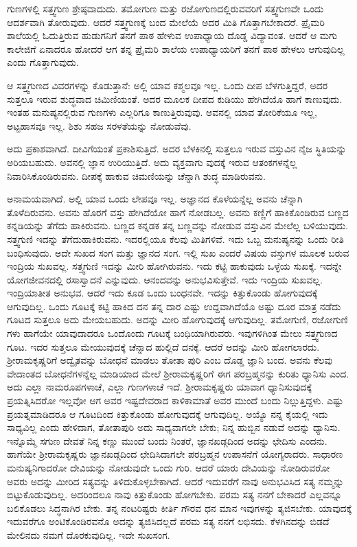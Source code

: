 ಗುಣಗಳಲ್ಲಿ ಸತ್ತ್ವಗುಣ ಶ್ರೇಷ್ಠವಾದುದು. ತಮೋಗುಣ ಮತ್ತು ರಜೋಗುಣದಲ್ಲಿರುವವರಿಗೆ ಸತ್ತ್ವಗುಣವೇ ಒಂದು ಆದರ್ಶವಾಗಿ ತೋರುವುದು. ಆದರೆ ಸತ್ತ್ವಗುಣಕ್ಕೆ ಬಂದ ಮೇಲೆಯೆ ಅದರ ಮಿತಿ ಗೊತ್ತಾಗಬೇಕಾದರೆ. ಪ್ರೈಮರಿ ಶಾಲೆಯಲ್ಲಿ ಓದುತ್ತಿರುವ ಹುಡುಗನಿಗೆ ತನಗೆ ಪಾಠ ಹೇಳುವ ಉಪಾಧ್ಯಾಯ ದೊಡ್ಡ ವಿದ್ಯಾವಂತ. ಆದರೆ ಆ ಮಗು ಕಾಲೇಜಿಗೆ ಏನಾದರೂ ಹೋದರೆ ಆಗ ತನ್ನ ಪ್ರೈಮರಿ ಶಾಲೆಯ ಉಪಾಧ್ಯಾಯರಿಗೆ ತನಗೆ ಪಾಠ ಹೇಳಲು ಆಗುವುದಿಲ್ಲ ಎಂದು ಗೊತ್ತಾಗುವುದು.

ಆ ಸತ್ತ್ವಗುಣದ ವಿವರಗಳನ್ನು ಕೊಡುತ್ತಾನೆ: ಅಲ್ಲಿ ಯಾವ ಕಶ್ಮಲವೂ ಇಲ್ಲ. ಒಂದು ದೀಪ ಬೆಳಗುತ್ತಿದ್ದರೆ, ಅದರ ಸುತ್ತಲೂ ಇರುವ ಶುದ್ಧವಾದ ಚಿಮಿಣಿಯಂತೆ. ಅದರ ಮೂಲಕ ದೀಪದ ಕುಡಿಯು ಹೇಗಿದೆಯೊ ಹಾಗೆ ಕಾಣುವುದು. ಇಂತಹ ಮನುಷ್ಯನಲ್ಲಿರುವ ಗುಣಗಳು ಎಲ್ಲರಿಗೂ ಕಾಣುತ್ತಿರುವುವು. ಅವನಲ್ಲಿ ಯಾವ ತೋರಿಕೆಯೂ ಇಲ್ಲ, ಅಟ್ಟಹಾಸವೂ ಇಲ್ಲ. ಶಿಶು ಸಹಜ ಸರಳತೆಯನ್ನು ನೋಡುವೆವು.

ಅದು ಪ್ರಕಾಶವಾಗಿದೆ. ದೀವಿಗೆಯಂತೆ ಪ್ರಕಾಶಿಸುತ್ತಿದೆ. ಅದರ ಬೆಳಕಿನಲ್ಲಿ ಸುತ್ತಲೂ ಇರುವ ವಸ್ತುವಿನ ನೈಜ ಸ್ಥಿತಿಯನ್ನು ಅರಿಯಬಹುದು. ಅವನಲ್ಲಿ ಜ್ಞಾನ ಉರಿಯುತ್ತಿದೆ. ಅದು ವ್ಯಕ್ತವಾಗು ವುದಕ್ಕೆ ಇರುವ ಆತಂಕಗಳನ್ನೆಲ್ಲ ನಿವಾರಿಸಿಕೊಂಡಿರುವನು. ದೀಪಕ್ಕೆ ಹಾಕುವ ಚಿಮಣಿಯನ್ನು ಚೆನ್ನಾಗಿ ಶುದ್ಧ ಮಾಡಿರುವನು.

ಅನಾಮಯವಾಗಿದೆ. ಅಲ್ಲಿ ಯಾವ ಒಂದು ಲೇಪವೂ ಇಲ್ಲ. ಅಜ್ಞಾನದ ಕೊಳೆಯನ್ನೆಲ್ಲ ಅವನು ಚೆನ್ನಾಗಿ ತೊಳೆದಿರುವನು. ಅವನು ಹೊರಗೆ ವಸ್ತು ಹೇಗಿದೆಯೋ ಹಾಗೆ ನೋಡಬಲ್ಲ. ಅವನು ಕಣ್ಣಿಗೆ ಹಾಕಿಕೊಂಡಿರುವ ಬಣ್ಣದ ಕನ್ನಡಿಯನ್ನು ತೆಗೆದು ಹಾಕಿರುವನು. ಬಣ್ಣದ ಕನ್ನಡಕ ತನ್ನ ಬಣ್ಣವನ್ನು ನೋಡುವ ವಸ್ತುವಿನ ಮೇಲೆಲ್ಲ ಬಳಿಯುವುದು. ಸತ್ತ್ವಗುಣಿ ಇದನ್ನು ತೆಗೆದುಹಾಕಿರುವನು. ಇದರಲ್ಲಿಯೂ ಕೆಲವು ಮಿತಿಗಳಿವೆ. ಇದು ಒಬ್ಬ ಮನುಷ್ಯನನ್ನು ಒಂದು ರೀತಿ ಬಂಧಿಸುವುದು. ಅದೇ ಸುಖದ ಸಂಗ ಮತ್ತು ಜ್ಞಾನದ ಸಂಗ. ಇಲ್ಲಿ ಸುಖ ಎಂದರೆ ವಿಷಯ ವಸ್ತುಗಳ ಮೂಲಕ ಬರುವ ಇಂದ್ರಿಯ ಸುಖವಲ್ಲ. ಸತ್ತ್ವಗುಣಿ ಇದನ್ನು ಮೀರಿ ಹೋಗಿರುವನು. ಇದು ಕಟ್ಟಿ ಹಾಕುವುದು ಒಳ್ಳೆಯ ಸುಖಕ್ಕೆ. ಇದನ್ನೇ ಯೋಗಜೀವನದಲ್ಲಿ ರಸಾಸ್ವಾದನೆ ಎನ್ನುವುದು. ಆನಂದವನ್ನು ಅನುಭವಿಸುತ್ತೇವೆ. ಇದು ಇಂದ್ರಿಯ ಸುಖವಲ್ಲ. ಇಂದ್ರಿಯಾತೀತ ಅನುಭವ. ಆದರೆ ಇದು ಕೂಡ ಒಂದು ಬಂಧನವೇ. ಇದನ್ನು ಕಿತ್ತುಕೊಂಡು ಹೋಗುವುದಕ್ಕೆ ಆಗುವುದಿಲ್ಲ. ಒಂದು ಗೂಟಕ್ಕೆ ಕಟ್ಟಿ ಹಾಕಿದ ದನ ತನ್ನ ದಾರ ಎಷ್ಟು ಉದ್ದವಾಗಿದೆಯೊ ಅಷ್ಟು ದೂರ ಮಾತ್ರ ನಡೆದು ಗೂಟದ ಸುತ್ತಲೂ ಅದು ಮೇಯಬಹುದು. ಅದನ್ನು ಮೀರಿ ಹೋಗುವುದಕ್ಕೆ ಆಗುವುದಿಲ್ಲ. ತಮೋಗುಣಿ, ರಜೋಗುಣಿ ಗಳು ಹಾಗೆಯೇ ಯಾವುದಾದರೂ ಒಂದೊಂದು ಗೂಟಕ್ಕೆ ಬಂಧಿಯಾಗಿರುವರು. ಇವುಗಳಿಗಿಂತ ಮೇಲು ಸತ್ತ್ವಗುಣದ ಗೂಟ. ಇದರ ಸುತ್ತಲೂ ಮೇಯುವುದಕ್ಕೆ ಚೆನ್ನಾದ ಹುಲ್ಲಿದೆ ದನಕ್ಕೆ. ಆದರೆ ಅದನ್ನು ಮೀರಿ ಹೋಗಲಾರದು. ಶ್ರೀರಾಮಕೃಷ್ಣರಿಗೆ ಅದ್ವೈತವನ್ನು ಬೋಧನೆ ಮಾಡಲು ತೋತಾ ಪುರಿ ಎಂಬ ದೊಡ್ಡ ಜ್ಞಾನಿ ಬಂದ. ಅವನು ಕೆಲವು ವೇದಾಂತದ ಬೋಧನೆಗಳನ್ನೆಲ್ಲ ಮಾಡಿಯಾದ ಮೇಲೆ ಶ್ರೀರಾಮಕೃಷ್ಣರಿಗೆ ಈಗ ಪರಬ್ರಹ್ಮನನ್ನು ಕುರಿತು ಧ್ಯಾನಿಸು ಎಂದ. ಅದು ಎಲ್ಲಾ ನಾಮರೂಪಗಳಾಚೆ, ಎಲ್ಲಾ ಗುಣಗಳಾಚೆ ಇದೆ. ಶ್ರೀರಾಮಕೃಷ್ಣರು ಯಾವಾಗ ಧ್ಯಾನಿಸುವುದಕ್ಕೆ ಪ್ರಯತ್ನಿಸಿದರೋ ಇಲ್ಲವೋ ಆಗ ಅವರ ಇಷ್ಟದೇವರಾದ ಕಾಳಿಕಾಮಾತೆ ಅವರ ಮುಂದೆ ಬಂದು ನಿಲ್ಲುತ್ತಿದ್ದಳು. ಎಷ್ಟು ಪ್ರಯತ್ನಮಾಡಿದರೂ ಆ ಗೂಟದಿಂದ ಕಿತ್ತುಕೊಂಡು ಹೋಗುವುದಕ್ಕೆ ಆಗುವುದಿಲ್ಲ. ಅಯ್ಯೊ ನನ್ನ ಕೈಯಲ್ಲಿ ಇದು ಸಾಧ್ಯವಿಲ್ಲ ಎಂದು ಹೇಳಿದಾಗ, ತೋತಾಪುರಿ ಅದು ಸಾಧ್ಯವಾಗಲೇ ಬೇಕು; ನಿನ್ನ ಹುಬ್ಬಿನ ನಡುವೆ ಅದನ್ನು ಧ್ಯಾನಿಸು. ಇನ್ನೊಮ್ಮೆ ಸಗುಣ ದೇವತೆ ನಿನ್ನ ಕಣ್ಣು ಮುಂದೆ ಬಂದು ನಿಂತರೆ, ಜ್ಞಾನಖಡ್ಗದಿಂದ ಅದನ್ನು ಛೇದಿಸು ಎಂದನು. ಹಾಗೆಯೇ ಶ್ರೀರಾಮಕೃಷ್ಣರು ಜ್ಞಾನಖಡ್ಗದಿಂದ ಛೇದಿಸಿದಾಗಲೇ ಪರಬ್ರಹ್ಮನ ಉಪಾಸನೆಗೆ ಯೋಗ್ಯರಾದರು. ಸಾಧಾರಣ ಮನುಷ್ಯನಿಗಾದರೋ ದೇವಿಯನ್ನು ನೋಡುವುದೇ ಒಂದು ಗುರಿ. ಆದರೆ ಯಾರು ದೇವಿಯನ್ನು ನೋಡಿರುವರೋ ಅವರು ಅದನ್ನು ಮೀರಿದ ಸತ್ಯವನ್ನು ತಿಳಿದುಕೊಳ್ಳಬೇಕಾಗಿದೆ. ಆದರೆ ಇದುವರೆಗೆ ನಾವು ಅನುಭವಿಸಿದ ಸತ್ಯ ನಮ್ಮನ್ನು ಬಿಟ್ಟುಕೊಡುವುದಿಲ್ಲ. ಅದರಿಂದಲೂ ನಾವು ಕಿತ್ತುಕೊಂಡು ಹೋಗಬೇಕು. ಪರಮ ಸತ್ಯ ನನಗೆ ಬೇಕಾದರೆ ಎಲ್ಲವನ್ನೂ ಬಲಿಕೊಡಲು ಸಿದ್ಧನಾಗಿರ ಬೇಕು. ತನ್ನ ನಂಟರಿಷ್ಟರು ಕೀರ್ತಿ ಗೌರವ ಧನ ಮಾನ ಇವುಗಳನ್ನು ತ್ಯಜಿಸಬೇಕು. ಯಾವುದಕ್ಕೆ ಇದುವರೆಗೂ ಅಂಟಿಕೊಂಡಿರವನೊ ಅದನ್ನು ತ್ಯಜಿಸಿದಲ್ಲದೆ ಪರಮ ಸತ್ಯ ನನಗೆ ಲಭಿಸದು. ಕೆಳಗಿನದನ್ನು ಬಿಡದೆ ಮೇಲಿನದು ನಮಗೆ ದೊರಕುವುದಿಲ್ಲ. ಇದೇ ಸುಖಸಂಗ.

